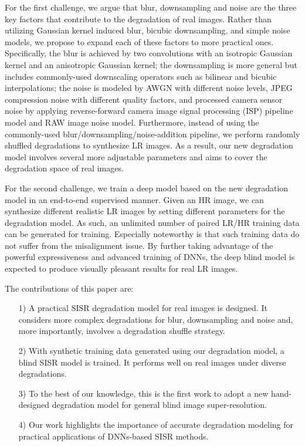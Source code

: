 \documentclass[10pt,twocolumn,letterpaper]{article}
\begin{document}
For the first challenge, we argue that blur, downsampling and noise are the three key factors that contribute to the degradation of real images. Rather than utilizing Gaussian kernel induced blur, bicubic downsampling, and simple noise models, we propose to expand each of these factors to more practical ones.
Specifically, the blur is achieved by two convolutions with an isotropic Gaussian kernel and an anisotropic Gaussian kernel; the downsampling is more general but includes commonly-used downscaling operators such as bilinear and bicubic interpolations; the noise is modeled by AWGN with different noise levels, JPEG compression noise with different quality factors, and processed camera sensor noise by applying reverse-forward camera image signal processing (ISP) pipeline model and RAW image noise model. Furthermore, instead of using the commonly-used blur/downsampling/noise-addition pipeline, we perform randomly shuffled degradations to synthesize LR images.
As a result, our new degradation model involves several more adjustable parameters and aims to cover the degradation space of real images.


For the second challenge, we train a deep model based on the new degradation model in an end-to-end supervised manner.
Given an HR image, we can synthesize different realistic LR images by setting different parameters for the degradation model. As such, an unlimited number of paired LR/HR training data can be generated for training.
Especially noteworthy is that such training data do not suffer from the misalignment issue.
By further taking advantage of the powerful expressiveness and advanced training of DNNs, the deep blind model is expected to produce visually pleasant results for real LR images.


The contributions of this paper are:
\begin{itemize}
  \item[1)] A practical SISR degradation model for real images is designed. It considers more complex degradations for blur, downsampling and noise and, more importantly, involves a degradation shuffle strategy.
  \item[2)] With synthetic training data generated using our degradation model, a blind SISR model is trained. It performs well on real images under diverse degradations.
  \item[3)] To the best of our knowledge, this is the first work to adopt a new hand-designed degradation model for general blind image super-resolution.
  \item[4)] Our work highlights the importance of accurate degradation modeling for practical applications of DNNs-based SISR methods.
\end{itemize}
\end{document}
